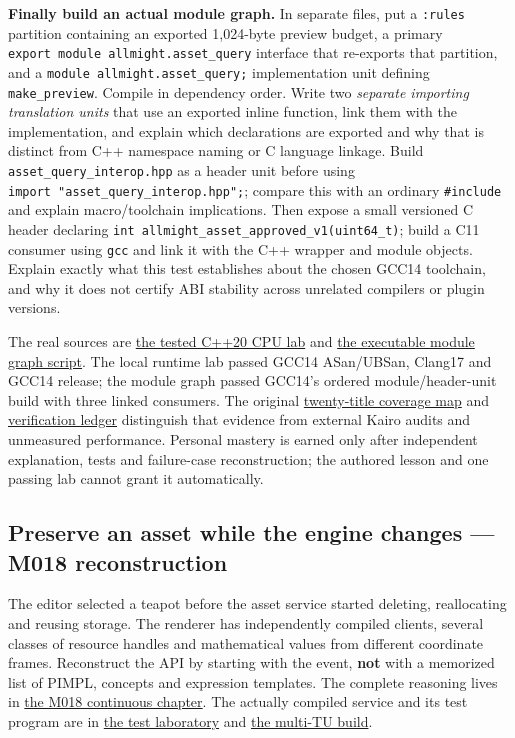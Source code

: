 \textbf{Finally build an actual module graph.} In separate files, put a \texttt{:rules} partition containing an exported 1,024-byte preview budget, a primary \texttt{export\ module\ allmight.asset\_query} interface that re-exports that partition, and a \texttt{module\ allmight.asset\_query;} implementation unit defining \texttt{make\_preview}. Compile in dependency order. Write two \emph{separate importing translation units} that use an exported inline function, link them with the implementation, and explain which declarations are exported and why that is distinct from C++ namespace naming or C language linkage. Build \texttt{asset\_query\_interop.hpp} as a header unit before using \texttt{import\ "asset\_query\_interop.hpp";}; compare this with an ordinary \texttt{\#include} and explain macro/toolchain implications. Then expose a small versioned C header declaring \texttt{int\ allmight\_asset\_approved\_v1(uint64\_t)}; build a C11 consumer using \texttt{gcc} and link it with the C++ wrapper and module objects. Explain exactly what this test establishes about the chosen GCC14 toolchain, and why it does not certify ABI stability across unrelated compilers or plugin versions.

The real sources are \hyperref[source-file-a1c76c44bc377537c732f5c4]{the tested C++20 CPU lab} and \hyperref[source-file-e1b7c3e4f52da0e7c9c36a41]{the executable module graph script}. The local runtime lab passed GCC14 ASan/UBSan, Clang17 and GCC14 release; the module graph passed GCC14's ordered module/header-unit build with three linked consumers. The original \hyperref[appendix-fd090d982a15-m017-parts-271290-lazy-asset-queries-allocation-lifetimes-and-compiled-api-boundaries]{twenty-title coverage map} and \hyperref[appendix-a103e7846d21-phase-7-additive-reconstruction-m017-parts-271290]{verification ledger} distinguish that evidence from external Kairo audits and unmeasured performance. Personal mastery is earned only after independent explanation, tests and failure-case reconstruction; the authored lesson and one passing lab cannot grant it automatically.

\subsection{Preserve an asset while the engine changes --- M018 reconstruction}\label{appendix-960160274237-preserve-an-asset-while-the-engine-changes-m018-reconstruction}

The editor selected a teapot before the asset service started deleting, reallocating and reusing storage. The renderer has independently compiled clients, several classes of resource handles and mathematical values from different coordinate frames. Reconstruct the API by starting with the event, \textbf{not} with a memorized list of PIMPL, concepts and expression templates. The complete reasoning lives in \hyperref[01-foundations-i-ch007-a-registry-crosses-its-last-c-boundary-hidden-implementation-typed-identity-and-measured-abstraction-cost]{the M018 continuous chapter}. The actually compiled service and its test program are in \hyperref[source-file-8aedc3fdcd10c91971507448]{the test laboratory} and \hyperref[source-file-c936569afa19be638ec87991]{the multi-TU build}.

